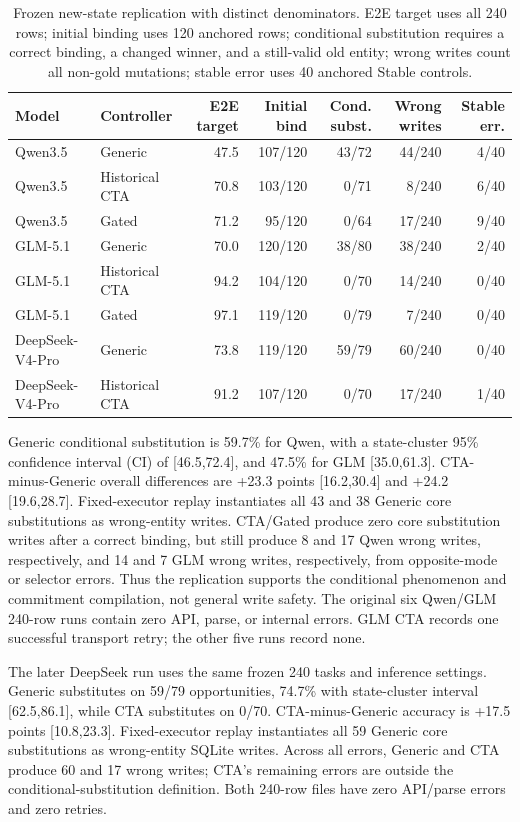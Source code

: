 \documentclass[10pt]{article}
\begin{document}
\begin{table}[h]
\centering
\small
\begin{tabular}{llrrrrr}
\toprule
Model & Controller & E2E target & Initial bind & Cond. subst. & Wrong writes & Stable err. \\
\midrule
Qwen3.5 & Generic & 47.5 & 107/120 & 43/72 & 44/240 & 4/40 \\
Qwen3.5 & Historical CTA & 70.8 & 103/120 & 0/71 & 8/240 & 6/40 \\
Qwen3.5 & Gated & 71.2 & 95/120 & 0/64 & 17/240 & 9/40 \\
GLM-5.1 & Generic & 70.0 & 120/120 & 38/80 & 38/240 & 2/40 \\
GLM-5.1 & Historical CTA & 94.2 & 104/120 & 0/70 & 14/240 & 0/40 \\
GLM-5.1 & Gated & 97.1 & 119/120 & 0/79 & 7/240 & 0/40 \\
DeepSeek-V4-Pro & Generic & 73.8 & 119/120 & 59/79 & 60/240 & 0/40 \\
DeepSeek-V4-Pro & Historical CTA & 91.2 & 107/120 & 0/70 & 17/240 & 1/40 \\
\bottomrule
\end{tabular}
\caption{Frozen new-state replication with distinct denominators. E2E target uses all 240 rows;
initial binding uses 120 anchored rows; conditional substitution requires a correct binding, a changed
winner, and a still-valid old entity; wrong writes count all non-gold mutations; stable error uses
40 anchored Stable controls.}
\end{table}

Generic conditional substitution is 59.7\% for Qwen, with a state-cluster 95\% confidence interval
(CI) of [46.5,72.4], and
47.5\% for GLM [35.0,61.3]. CTA-minus-Generic overall differences are +23.3 points
[16.2,30.4] and +24.2 [19.6,28.7]. Fixed-executor replay instantiates all 43 and 38 Generic core
substitutions as wrong-entity writes. CTA/Gated produce zero core substitution writes after a correct binding, but
still produce 8 and 17 Qwen wrong writes, respectively, and 14 and 7 GLM wrong writes,
respectively, from opposite-mode or selector errors. Thus
the replication supports the conditional phenomenon and commitment compilation, not general
write safety. The original six Qwen/GLM 240-row runs contain zero API, parse, or internal errors.
GLM CTA records one successful transport retry; the other five runs record none.

The later DeepSeek run uses the same frozen 240 tasks and inference settings. Generic substitutes
on 59/79 opportunities, 74.7\% with state-cluster interval [62.5,86.1], while CTA substitutes on 0/70.
CTA-minus-Generic accuracy is +17.5 points [10.8,23.3]. Fixed-executor replay instantiates all 59
Generic core substitutions as wrong-entity SQLite writes. Across all errors, Generic and CTA produce 60 and 17 wrong writes;
CTA's remaining errors are outside the conditional-substitution definition. Both 240-row files have zero
API/parse errors and zero retries.
\end{document}
